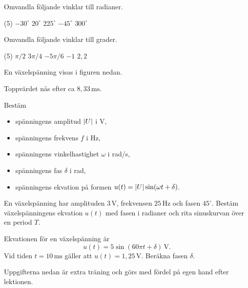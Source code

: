 
Omvandla följande vinklar till radianer.
\begin{delar}(5)
  \task $-30^{\circ}$
  \task $20^{\circ}$
  \task $225^{\circ}$
  \task $-45^{\circ}$
  \task $300^{\circ}$
\end{delar}

Omvandla följande vinklar till grader.
\begin{delar}(5)
  \task $\pi/2$
  \task $3\pi/4$
  \task $-5\pi/6$
  \task $-1$
  \task $2{,}2$
\end{delar}

En växelspänning visas i figuren nedan.


\begin{aside}
\note[Obs] Toppvärdet nås efter ca $8{,}33\,\text{ms}$.
\end{aside}

\noindent Bestäm
\begin{itemize}
  \item spänningens amplitud $\lvert U\rvert$ i V,
  \item spänningens frekvens $f$ i Hz,
  \item spänningens vinkelhastighet $\omega$ i rad/s,
  \item spänningens fas $\delta$ i rad,
  \item spänningens ekvation på formen $u(t) = \lvert U\rvert\sin(\omega t + \delta)$.
\end{itemize}

En växelspänning har amplituden $3\,\text{V}$, frekvensen $25\,\text{Hz}$ och fasen $45^{\circ}$.
Bestäm växelspänningens ekvation $u(t)$ med fasen i radianer och rita sinuskurvan över en
period $T$.

Ekvationen för en växelspänning är
\[
  u(t) = 5\sin(60\pi t + \delta)\,\text{V}.
\]
Vid tiden $t = 10\,\text{ms}$ gäller att $u(t) = 1{,}25\,\text{V}$. Beräkna fasen $\delta$.

Uppgifterna nedan är extra träning och görs med fördel på egen hand efter lektionen.

